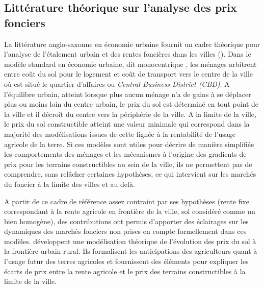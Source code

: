 \documentclass[10.5pt,a4paper]{article}
\begin{document}
{%

\subsection{Littérature théorique sur l'analyse des prix fonciers}
 
La littérature anglo-saxonne en économie urbaine fournit un cadre théorique pour l'analyse de l'étalement urbain  et des rentes foncières dans les villes (\cite{Alonso64, Mills67, Muth69}). Dans le modèle standard en économie urbaine, dit \og monocentrique \fg, les ménages arbitrent entre coût du sol pour le logement et coût de transport vers le centre de la ville où est situé le quartier d'affaires ou \textit{Central Business District (CBD)}. A l'équilibre urbain, atteint lorsque plus aucun ménage n'a de gains à se déplacer plus ou moins loin du centre urbain, le prix du sol est déterminé en tout point de la ville et il décroît du centre vers la périphérie de la ville. A la limite de la ville, le prix du sol constructible atteint une valeur minimale qui correspond dans la majorité des modélisations issues de cette lignée à la rentabilité de l'usage agricole de la terre. Si ces modèles sont utiles pour décrire de manière simplifiée les comportements des ménages et les mécanismes à l'origine des gradients de prix pour les terrains constructibles au sein de la ville, ils ne permettent pas de comprendre, sans relâcher certaines hypothèses, ce qui intervient sur les marchés du foncier à la limite des villes et au delà. \par
 
A partir de ce cadre de référence assez contraint par ses hypothèses  (rente fixe correspondant à la rente agricole en frontière de la ville, sol considéré comme un bien homogène), des contributions ont permis d'apporter des éclairages sur les dynamiques des marchés fonciers non prises en compte formellement dans ces modèles. \cite{Capozza89,Capozza90} développent une modélisation théorique de l'évolution des prix du sol à la frontière urbain-rural. Ils formalisent les anticipations des agriculteurs quant à l'usage futur des terres agricoles et fournissent des éléments pour expliquer les écarts de prix entre la rente agricole et le prix des terrains constructibles à la limite de la ville. \par

}
\end{document}

